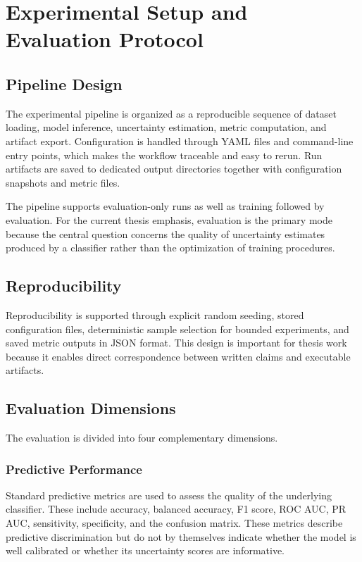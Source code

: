 \chapter{Experimental Setup and Evaluation Protocol}
\label{chap:experimental_setup}

\section{Pipeline Design}

The experimental pipeline is organized as a reproducible sequence of dataset loading, model inference, uncertainty estimation, metric computation, and artifact export. Configuration is handled through YAML files and command-line entry points, which makes the workflow traceable and easy to rerun. Run artifacts are saved to dedicated output directories together with configuration snapshots and metric files.

The pipeline supports evaluation-only runs as well as training followed by evaluation. For the current thesis emphasis, evaluation is the primary mode because the central question concerns the quality of uncertainty estimates produced by a classifier rather than the optimization of training procedures.

\section{Reproducibility}

Reproducibility is supported through explicit random seeding, stored configuration files, deterministic sample selection for bounded experiments, and saved metric outputs in JSON format. This design is important for thesis work because it enables direct correspondence between written claims and executable artifacts.

\section{Evaluation Dimensions}

The evaluation is divided into four complementary dimensions.

\subsection{Predictive Performance}

Standard predictive metrics are used to assess the quality of the underlying classifier. These include accuracy, balanced accuracy, F1 score, ROC AUC, PR AUC, sensitivity, specificity, and the confusion matrix. These metrics describe predictive discrimination but do not by themselves indicate whether the model is well calibrated or whether its uncertainty scores are informative.

